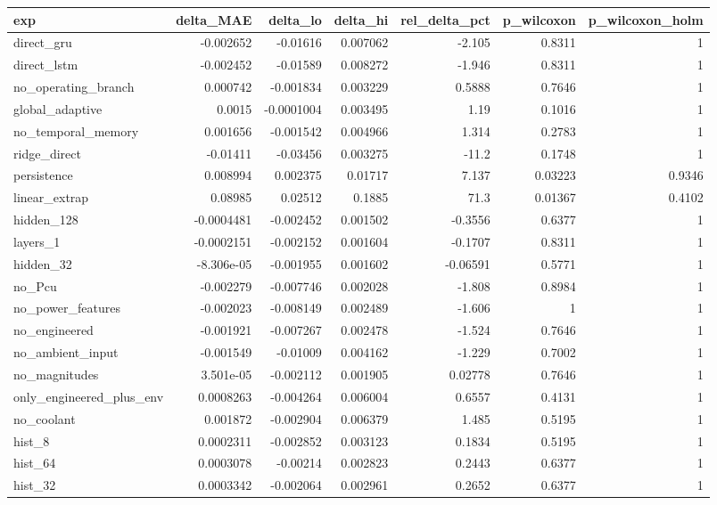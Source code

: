 \begin{tabular}{lrrrrrr}
\toprule
exp & delta\_MAE & delta\_lo & delta\_hi & rel\_delta\_pct & p\_wilcoxon & p\_wilcoxon\_holm \\
\midrule
direct\_gru & -0.002652 & -0.01616 & 0.007062 & -2.105 & 0.8311 & 1 \\
direct\_lstm & -0.002452 & -0.01589 & 0.008272 & -1.946 & 0.8311 & 1 \\
no\_operating\_branch & 0.000742 & -0.001834 & 0.003229 & 0.5888 & 0.7646 & 1 \\
global\_adaptive & 0.0015 & -0.0001004 & 0.003495 & 1.19 & 0.1016 & 1 \\
no\_temporal\_memory & 0.001656 & -0.001542 & 0.004966 & 1.314 & 0.2783 & 1 \\
ridge\_direct & -0.01411 & -0.03456 & 0.003275 & -11.2 & 0.1748 & 1 \\
persistence & 0.008994 & 0.002375 & 0.01717 & 7.137 & 0.03223 & 0.9346 \\
linear\_extrap & 0.08985 & 0.02512 & 0.1885 & 71.3 & 0.01367 & 0.4102 \\
hidden\_128 & -0.0004481 & -0.002452 & 0.001502 & -0.3556 & 0.6377 & 1 \\
layers\_1 & -0.0002151 & -0.002152 & 0.001604 & -0.1707 & 0.8311 & 1 \\
hidden\_32 & -8.306e-05 & -0.001955 & 0.001602 & -0.06591 & 0.5771 & 1 \\
no\_Pcu & -0.002279 & -0.007746 & 0.002028 & -1.808 & 0.8984 & 1 \\
no\_power\_features & -0.002023 & -0.008149 & 0.002489 & -1.606 & 1 & 1 \\
no\_engineered & -0.001921 & -0.007267 & 0.002478 & -1.524 & 0.7646 & 1 \\
no\_ambient\_input & -0.001549 & -0.01009 & 0.004162 & -1.229 & 0.7002 & 1 \\
no\_magnitudes & 3.501e-05 & -0.002112 & 0.001905 & 0.02778 & 0.7646 & 1 \\
only\_engineered\_plus\_env & 0.0008263 & -0.004264 & 0.006004 & 0.6557 & 0.4131 & 1 \\
no\_coolant & 0.001872 & -0.002904 & 0.006379 & 1.485 & 0.5195 & 1 \\
hist\_8 & 0.0002311 & -0.002852 & 0.003123 & 0.1834 & 0.5195 & 1 \\
hist\_64 & 0.0003078 & -0.00214 & 0.002823 & 0.2443 & 0.6377 & 1 \\
hist\_32 & 0.0003342 & -0.002064 & 0.002961 & 0.2652 & 0.6377 & 1 \\

\end{tabular}
